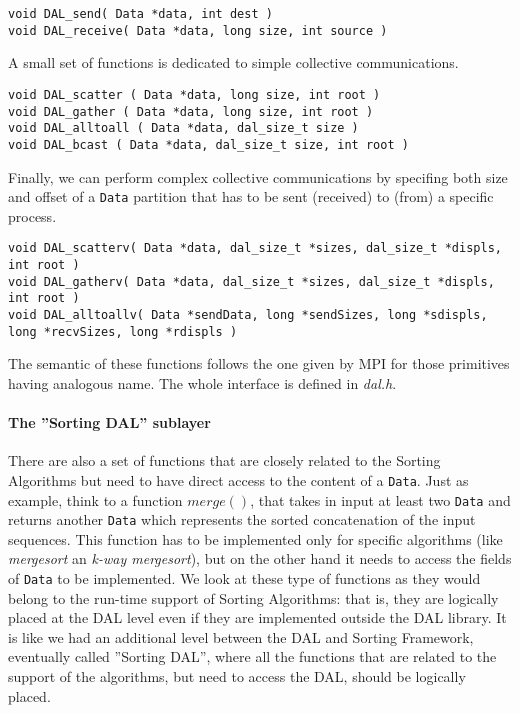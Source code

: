 \begin{lstlisting}
void DAL_send( Data *data, int dest )
void DAL_receive( Data *data, long size, int source )
\end{lstlisting}
A small set of functions is dedicated to simple collective communications.
\begin{lstlisting}
void DAL_scatter ( Data *data, long size, int root )
void DAL_gather ( Data *data, long size, int root )
void DAL_alltoall ( Data *data, dal_size_t size )
void DAL_bcast ( Data *data, dal_size_t size, int root )
\end{lstlisting}
Finally, we can perform complex collective communications by specifing both size and offset of a \texttt{Data} partition that has to be sent (received) to (from) a specific process. 
\begin{lstlisting}
void DAL_scatterv( Data *data, dal_size_t *sizes, dal_size_t *displs, int root )
void DAL_gatherv( Data *data, dal_size_t *sizes, dal_size_t *displs, int root )
void DAL_alltoallv( Data *sendData, long *sendSizes, long *sdispls, long *recvSizes, long *rdispls )
\end{lstlisting}
The semantic of these functions follows the one given by MPI for those primitives having analogous name. The whole interface is defined in \textit{dal.h}.

\paragraph{The ''Sorting DAL'' sublayer} There are also a set of functions that are closely related to the Sorting Algorithms but need to have direct access to the content of a \texttt{Data}.  Just as example, think to a function $merge()$, that takes in input at least two \texttt{Data} and returns another \texttt{Data} which represents the sorted concatenation of the input sequences. This function has to be implemented only for specific algorithms (like \textit{mergesort} an \textit{k-way mergesort}), but on the other hand it needs to access the fields of \texttt{Data} to be implemented. We look at these type of functions as they would belong to the run-time support of Sorting Algorithms: that is, they are logically placed at the DAL level even if they are implemented outside the DAL library. It is like we had an additional level between the DAL and Sorting Framework, eventually called ''Sorting DAL'', where all the functions that are related to the support of the algorithms, but need to access the DAL, should be logically placed. 


